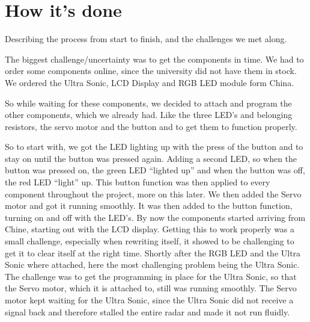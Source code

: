 \chapter{How it's done}
Describing the process from start to finish, and the challenges we met along. 

The biggest challenge/uncertainty was to get the components in time. We had to order some components online, since the university did not have them in stock. We ordered the Ultra Sonic, LCD Display and RGB LED module form China. 

So while waiting for these components, we decided to attach and program the other components, which we already had. Like the three LED’s and belonging resistors, the servo motor and the button and to get them to function properly. 

So to start with, we got the LED lighting up with the press of the button and to stay on until the button was pressed again. Adding a second LED, so when the button was pressed on, the green LED ``lighted up'' and when the button was off, the red LED ``light'' up. This button function was then applied to every component throughout the project, more on this later. We then added the Servo motor and got it running smoothly. It was then added to the button function, turning on and off with the LED's. By now the components started arriving from Chine, starting out with the LCD display. Getting this to work properly was a small challenge, especially when rewriting itself, it showed to be challenging to get it to clear itself at the right time. Shortly after the RGB LED and the Ultra Sonic where attached, here the most challenging problem being the Ultra Sonic. The challenge was to get the programming in place for the Ultra Sonic, so that the Servo motor, which it is attached to, still was running smoothly. The Servo motor kept waiting for the Ultra Sonic, since the Ultra Sonic did not receive a signal back and therefore stalled the entire radar and made it not run fluidly.